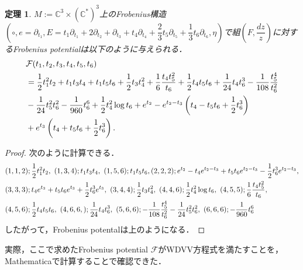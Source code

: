 \documentclass[a4paper,11pt]{jbook}
\theoremstyle{plain}
\newtheorem{thm}{定理}[section]
\theoremstyle{definition}
\theoremstyle{remark}
\theoremstyle{proof}
\numberwithin{equation}{section}
\def\CC{{\mathbb C}}
\def\F{{\mathcal F}}
\begin{document}
\begin{thm}
$M:=\CC^3\times(\CC^*)^3$上の\rm{Frobenius構造}$(\circ,e=\partial_{t_1},E=t_1\partial_{t_1}+2\partial_{t_2}+\partial_{t_3}+t_4\partial_{t_4}+\dfrac{2}{3}t_5\partial_{t_5}+\dfrac{1}{3}t_6\partial_{t_6},\eta)$で組$\left(F,\dfrac{dz}{z}\right)$に対するFrobenius potentialは以下のように与えられる．
\begin{align}
	&\F(t_1,t_2,t_3,t_4,t_5,t_6) \notag \\
&=\frac{1}{2}t_1^2t_2+t_1t_3t_4+t_1t_5t_6+\frac{1}{2}t_3t_4^2 +\dfrac{1}{6}\frac{t_4t_5^2}{t_6} + \dfrac{1}{2}t_4t_5t_6 + \frac{1}{24}t_4t_6^3 -\frac{1}{108}\frac{t_5^4}{t_6^2} \notag \\
&-\frac{1}{24}t_5^2t_6^2-\frac{1}{960}t_6^6 +\dfrac{1}{2}t_4^2\log{t_6}+e^{t_2}-e^{t_2-t_3}\left(t_4-t_5t_6+\dfrac{1}{2}t_6^3\right) \notag \\
&+e^{t_3}\left(t_4+t_5t_6+\dfrac{1}{2}t_6^3\right).
\end{align}
\end{thm}

\begin{proof}
次のように計算できる． 
\begin{align}
&(1,1,2) ; \dfrac{1}{2}t_1^2t_2, \ (1,3,4) ; t_1t_3t_4, \ (1,5,6) ; t_1t_5t_6, (2,2,2);e^{t_2}-t_4e^{t_2-t_3}+t_5t_6e^{t_2-t_3}-\dfrac{1}{2}t_6^3e^{t_2-t_3}, \notag \\
&(3,3,3) ; t_4e^{t_3}+t_5t_6e^{t_3}+\dfrac{1}{2}t_6^3e^{t_3}, \ (3,4,4) ; \dfrac{1}{2}t_3t_4^2, \ (4,4,6) ; \dfrac{1}{2}t_4^2\log{t_6}, \ (4,5,5) ; \dfrac{1}{6}\frac{t_4t_5^2}{t_6}, \ \notag \\
&(4,5,6) ; \dfrac{1}{2}t_4t_5t_6, \ (4,6,6,) ; \frac{1}{24}t_4t_6^3, \ (5,6,6) ; -\frac{1}{108}\frac{t_5^4}{t_6^2}-\frac{1}{24}t_5^2t_6^2, \ (6,6,6) ; -\frac{1}{960}t_6^6 \notag
\end{align}
したがって，Frobenius potentalは上のようになる．
\end{proof}

実際，ここで求めたFrobenius potential $\F$がWDVV方程式を満たすことを，Mathematicaで計算することで確認できた．
\end{document}
